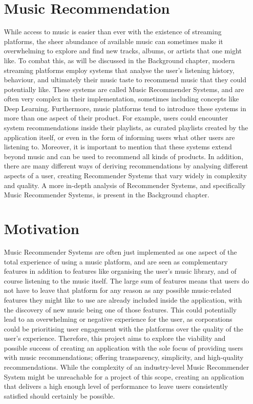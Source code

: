 \documentclass{l4proj}
\begin{document}
\section{Music Recommendation}
While access to music is easier than ever with the existence of streaming platforms, the sheer abundance of available music can sometimes make it overwhelming to explore and find new tracks, albums, or artists that one might like. To combat this, as will be discussed in the Background chapter, modern streaming platforms employ systems that analyse the user's listening history, behaviour, and ultimately their music taste to recommend music that they could potentially like. These systems are called Music Recommender Systems, and are often very complex in their implementation, sometimes including concepts like Deep Learning. Furthermore, music platforms tend to introduce these systems in more than one aspect of their product. For example, users could encounter system recommendations inside their playlists, as curated playlists created by the application itself, or even in the form of informing users what other users are listening to. Moreover, it is important to mention that these systems extend beyond music and can be used to recommend all kinds of products. In addition, there are many different ways of deriving recommendations by analysing different aspects of a user, creating Recommender Systems that vary widely in complexity and quality. A more in-depth analysis of Recommender Systems, and specifically Music Recommender Systems, is present in the Background chapter.
\section{Motivation}
Music Recommender Systems are often just implemented as one aspect of the total experience of using a music platform, and are seen as complementary features in addition to features like organising the user's music library, and of course listening to the music itself. The large sum of features means that users do not have to leave that platform for any reason as any possible music-related features they might like to use are already included inside the application, with the discovery of new music being one of those features. This could potentially lead to an overwhelming or negative experience for the user, as corporations could be prioritising user engagement with the platforms over the quality of the user's experience. Therefore, this project aims to explore the viability and possible success of creating an application with the sole focus of providing users with music recommendations; offering transparency, simplicity, and high-quality recommendations. While the complexity of an industry-level Music Recommender System might be unreachable for a project of this scope, creating an application that delivers a high enough level of performance to leave users consistently satisfied should certainly be possible.
\end{document}
